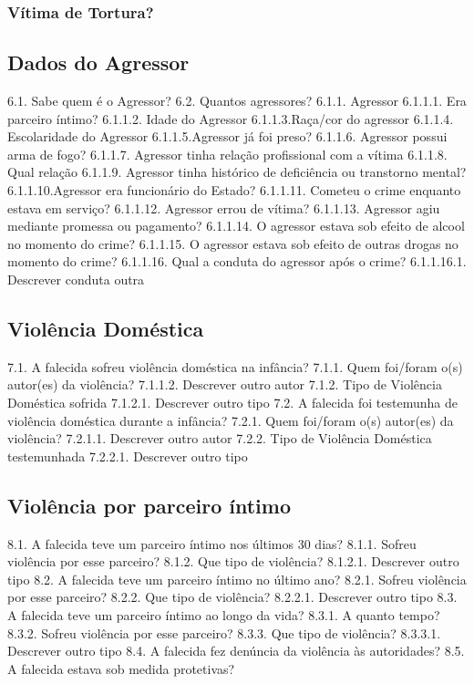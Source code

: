 \subsubsection{Vítima de Tortura?}

\subsection{Dados do Agressor}

6.1. Sabe quem é o Agressor?
6.2. Quantos agressores?
6.1.1. Agressor
6.1.1.1. Era parceiro íntimo?
6.1.1.2. Idade do Agressor
6.1.1.3.Raça/cor do agressor
6.1.1.4. Escolaridade do Agressor
6.1.1.5.Agressor já foi preso?
6.1.1.6. Agressor possui arma de fogo?
6.1.1.7. Agressor tinha relação profissional com a vítima
6.1.1.8. Qual relação
6.1.1.9. Agressor tinha histórico de deficiência ou transtorno mental?
6.1.1.10.Agressor era funcionário do Estado?
6.1.1.11. Cometeu o crime enquanto estava em serviço?
6.1.1.12. Agressor errou de vítima?
6.1.1.13. Agressor agiu mediante promessa ou pagamento?
6.1.1.14. O agressor estava sob efeito de alcool no momento do crime?
6.1.1.15. O agressor estava sob efeito de outras drogas no momento do crime?
6.1.1.16. Qual a conduta do agressor após o crime?
6.1.1.16.1. Descrever conduta outra

\subsection{Violência Doméstica}

7.1. A falecida sofreu violência doméstica na infância?
7.1.1. Quem foi/foram o(s) autor(es) da violência?
7.1.1.2. Descrever outro autor
7.1.2. Tipo de Violência Doméstica sofrida
7.1.2.1. Descrever outro tipo
7.2. A falecida foi testemunha de violência doméstica durante a infância?
7.2.1. Quem foi/foram o(s) autor(es) da violência?
7.2.1.1. Descrever outro autor
7.2.2. Tipo de Violência Doméstica testemunhada
7.2.2.1. Descrever outro tipo

\subsection{Violência por parceiro íntimo}

8.1. A falecida teve um parceiro íntimo nos últimos 30 dias?
8.1.1. Sofreu violência por esse parceiro?
8.1.2. Que tipo de violência?
8.1.2.1. Descrever outro tipo
8.2. A falecida teve um parceiro íntimo no último ano?
8.2.1. Sofreu violência por esse parceiro?
8.2.2. Que tipo de violência?
8.2.2.1. Descrever outro tipo
8.3. A falecida teve um parceiro íntimo ao longo da vida?
8.3.1. A quanto tempo? 
8.3.2. Sofreu violência por esse parceiro?
8.3.3. Que tipo de violência?
8.3.3.1. Descrever outro tipo
8.4. A falecida fez denúncia da violência às autoridades?
8.5. A falecida estava sob medida protetivas?

